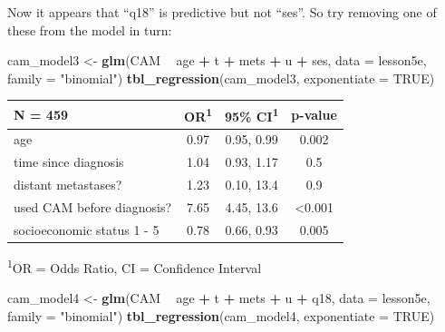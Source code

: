 \documentclass[]{book}
\newenvironment{Shaded}{\begin{snugshade}}{\end{snugshade}}
\newcommand{\DataTypeTok}[1]{\textcolor[rgb]{0.13,0.29,0.53}{#1}}
\newcommand{\KeywordTok}[1]{\textcolor[rgb]{0.13,0.29,0.53}{\textbf{#1}}}
\newcommand{\NormalTok}[1]{#1}
\newcommand{\OperatorTok}[1]{\textcolor[rgb]{0.81,0.36,0.00}{\textbf{#1}}}
\newcommand{\OtherTok}[1]{\textcolor[rgb]{0.56,0.35,0.01}{#1}}
\newcommand{\StringTok}[1]{\textcolor[rgb]{0.31,0.60,0.02}{#1}}
\begin{document}
Now it appears that ``q18'' is predictive but not ``ses''. So try removing one of these from the model in turn:

\begin{Shaded}
\begin{Highlighting}[]
\NormalTok{cam_model3 <-}\StringTok{ }\KeywordTok{glm}\NormalTok{(CAM }\OperatorTok{~}\StringTok{ }\NormalTok{age }\OperatorTok{+}\StringTok{ }\NormalTok{t }\OperatorTok{+}\StringTok{ }\NormalTok{mets }\OperatorTok{+}\StringTok{ }\NormalTok{u }\OperatorTok{+}\StringTok{ }\NormalTok{ses,}
                  \DataTypeTok{data =}\NormalTok{ lesson5e,}
                  \DataTypeTok{family =} \StringTok{"binomial"}\NormalTok{)}
\KeywordTok{tbl_regression}\NormalTok{(cam_model3, }\DataTypeTok{exponentiate =} \OtherTok{TRUE}\NormalTok{)}
\end{Highlighting}
\end{Shaded}

\captionsetup[table]{labelformat=empty,skip=1pt}
\begin{longtable}{lccc}
\toprule
\textbf{N = 459} & \textbf{OR}\textsuperscript{1} & \textbf{95\% CI}\textsuperscript{1} & \textbf{p-value} \\ 
\midrule
age & 0.97 & 0.95, 0.99 & 0.002 \\ 
time since diagnosis & 1.04 & 0.93, 1.17 & 0.5 \\ 
distant metastases? & 1.23 & 0.10, 13.4 & 0.9 \\ 
used CAM before diagnosis? & 7.65 & 4.45, 13.6 & <0.001 \\ 
socioeconomic status 1 - 5 & 0.78 & 0.66, 0.93 & 0.005 \\ 
\bottomrule
\end{longtable}
\vspace{-5mm}
\begin{minipage}{\linewidth}
\textsuperscript{1}OR = Odds Ratio, CI = Confidence Interval \\ 
\end{minipage}

\begin{Shaded}
\begin{Highlighting}[]
\NormalTok{cam_model4 <-}\StringTok{ }\KeywordTok{glm}\NormalTok{(CAM }\OperatorTok{~}\StringTok{ }\NormalTok{age }\OperatorTok{+}\StringTok{ }\NormalTok{t }\OperatorTok{+}\StringTok{ }\NormalTok{mets }\OperatorTok{+}\StringTok{ }\NormalTok{u }\OperatorTok{+}\StringTok{ }\NormalTok{q18,}
                  \DataTypeTok{data =}\NormalTok{ lesson5e,}
                  \DataTypeTok{family =} \StringTok{"binomial"}\NormalTok{)}
\KeywordTok{tbl_regression}\NormalTok{(cam_model4, }\DataTypeTok{exponentiate =} \OtherTok{TRUE}\NormalTok{)}
\end{Highlighting}
\end{Shaded}
\end{document}
